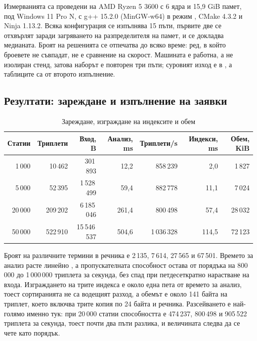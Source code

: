 Измерванията са проведени на AMD Ryzen 5 3600 с 6 ядра и 15{,}9 GiB памет, под Windows 11
Pro N, с g++ 15.2.0 (MinGW-w64) в режим , CMake 4.3.2 и Ninja
1.13.2. Всяка конфигурация се изпълнява 15 пъти, първите две се отхвърлят заради загряването на
разпределителя на памет, и се докладва медианата. Броят на решенията се отпечатва до всяко
време: ред, в който броевете не съвпадат, не е сравнение на скорост. Машината е работна, а не
изолиран стенд, затова наборът е повторен три пъти; суровият изход е в
, а таблиците са от второто изпълнение.

\subsection{Резултати: зареждане и изпълнение на заявки}

\begin{table}[H]
\caption{Зареждане, изграждане на индексите и обем}
\label{tab:loading}
\centering
\fontsize{9}{11}\selectfont
\setlength{\tabcolsep}{4pt}
\begin{tabular}{@{}rrrrrrr@{}}
\toprule
\textbf{Статии} & \textbf{Триплети} & \textbf{Вход, B} & \textbf{Анализ, ms} & \textbf{Триплети/s} & \textbf{Индекси, ms} & \textbf{Обем, KiB} \\
\midrule
1\,000  &  10\,462 &     301\,893 &  12{,}2 &   858\,239 &   2{,}0 &  1\,827 \\
5\,000  &  52\,395 &  1\,528\,499 &  59{,}4 &   882\,778 &  11{,}1 &  7\,024 \\
20\,000 & 209\,202 &  6\,185\,046 & 261{,}4 &   800\,498 &  57{,}4 & 28\,032 \\
50\,000 & 522\,910 & 15\,546\,537 & 504{,}6 & 1\,036\,328 & 114{,}5 & 72\,123 \\
\bottomrule
\end{tabular}
\end{table}

Броят на различните термини в речника е 2\,135, 7\,614, 27\,565 и 67\,501. Времето за анализ
расте линейно , а пропускателната способност остава от порядъка на
800\,000 до 1\,000\,000 триплета за секунда, без спад при петдесеткратно нарастване на входа.
Изграждането на трите индекса е около една пета от времето за анализ, тоест сортиранията не са
водещият разход, а обемът е около 141 байта на триплет, което включва трите копия по 24 байта
и речника. Разсейването е най-голямо именно тук: при 20\,000 статии способността е 474\,237,
800\,498 и 905\,522 триплета за секунда, тоест почти два пъти разлика, и величината следва да
се чете като порядък.

